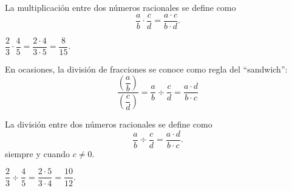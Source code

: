 
	
	La multiplicaci\'on entre dos números racionales se define como
	\[
		\dfrac{a}{b}\cdot\dfrac{c}{d}=\dfrac{a\cdot c}{b\cdot d}.
	\]
	
	\begin{problema}
		$\dfrac{2}{3}\cdot \dfrac{4}{5}=\dfrac{2\cdot 4}{3\cdot 5}=\dfrac{8}{15}.$
	\end{problema}
	




	\begin{observacion}
		En ocasiones, la divisi\'on de fracciones se conoce como regla del ``sandwich'':
		$$
		\dfrac{\left( \dfrac{a}{b} \right)}{\left( \dfrac{c}{d} \right)}=\dfrac{a}{b}\div \dfrac{c}{d}=\dfrac{a\cdot d}{b \cdot c}
		$$
	\end{observacion}
	




	
	La divisi\'on entre dos números racionales se define como
	\[
		\dfrac{a}{b}\div\dfrac{c}{d}=\dfrac{a\cdot d}{b\cdot c}.
	\]
	siempre y cuando $c\neq 0.$
	 
	
	\begin{problema}
		$\dfrac{2}{3}\div \dfrac{4}{5}=\dfrac{2\cdot 5}{3\cdot 4}=\dfrac{10}{12}.$
	\end{problema}
	

